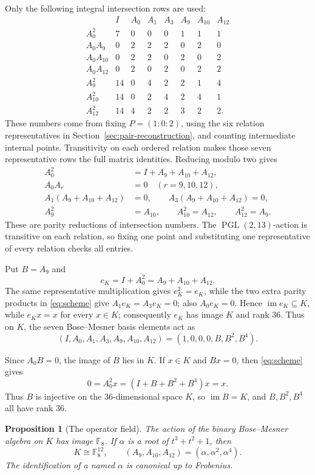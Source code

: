 \documentclass[11pt]{article}
\newtheorem{proposition}[theorem]{Proposition}
\theoremstyle{definition}
\theoremstyle{remark}
\newcommand{\F}{\mathbb F}
\newcommand{\PGL}{\operatorname{PGL}}
\begin{document}
Only the following integral intersection rows are used:
\[
\begin{array}{c|rrrrrrr}
 &I&A_0&A_1&A_3&A_9&A_{10}&A_{12}\\ \hline
A_0^2   &7&0&0&0&1&1&1\\
A_0A_9  &0&2&2&2&0&2&0\\
A_0A_{10}&0&2&2&0&2&0&2\\
A_0A_{12}&0&2&0&2&0&2&2\\
A_9^2   &14&0&4&2&2&1&4\\
A_{10}^2&14&0&2&4&2&4&1\\
A_{12}^2&14&4&2&2&3&2&2.
\end{array}
\]
These numbers come from fixing \(P=(1:0:2)\), using the six relation
representatives in Section~\ref{sec:pair-reconstruction}, and counting
intermediate internal points.
Transitivity on each ordered relation makes those seven representative rows
the full matrix identities.  Reducing modulo two gives
\begin{equation}
\label{eq:scheme}
\begin{split}
 A_0^2&=I+A_9+A_{10}+A_{12},\\
 A_0A_r&=0\quad(r=9,10,12),\\
 A_1(A_9+A_{10}+A_{12})&=0,\qquad
 A_3(A_9+A_{10}+A_{12})=0,\\
 A_9^2&=A_{10},\qquad A_{10}^2=A_{12},\qquad A_{12}^2=A_9.
\end{split}
\end{equation}
These are parity reductions of intersection numbers.  The
\(\PGL(2,13)\)-action is transitive on each relation, so fixing one point and
substituting one representative of every relation checks all entries.

Put \(B=A_9\) and
\[
 e_K=I+A_0^2=A_9+A_{10}+A_{12}.
\]
The same representative multiplication gives
\(e_K^2=e_K\), while the two extra parity products in
\eqref{eq:scheme} give \(A_1e_K=A_3e_K=0\); also
\(A_0e_K=0\).  Hence \(\operatorname{im}e_K\subseteq K\), while
\(e_Kx=x\) for every \(x\in K\); consequently \(e_K\) has image \(K\) and
rank \(36\).  Thus on \(K\), the seven Bose--Mesner basis elements act as
\[
 (I,A_0,A_1,A_3,A_9,A_{10},A_{12})
 =(1,0,0,0,B,B^2,B^4).
\]

Since \(A_0B=0\), the image of \(B\) lies in \(K\).  If
\(x\in K\) and \(Bx=0\), then \eqref{eq:scheme} gives
\[
 0=A_0^2x=(I+B+B^2+B^4)x=x.
\]
Thus \(B\) is injective on the 36-dimensional space \(K\), so
\(\operatorname{im}B=K\), and \(B,B^2,B^4\) all have rank 36.

\begin{proposition}[The operator field]
\label{prop:hidden-field}
The action of the binary Bose--Mesner algebra on \(K\) has image \(\F_8\).
If \(\alpha\) is a root of \(t^3+t^2+1\), then
\[
 K\cong\F_8^{12},\qquad
 (A_9,A_{10},A_{12})=(\alpha,\alpha^2,\alpha^4).
\]
The identification of a named \(\alpha\) is canonical up to Frobenius.
\end{proposition}
\end{document}

